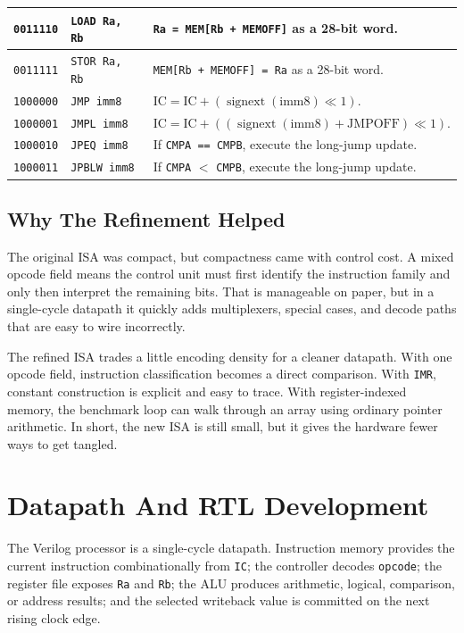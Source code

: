 \documentclass[12pt,a4paper]{article}
\begin{document}
\begin{table}[H]
\begin{tabularx}{\linewidth}{|l|l|Y|}
\texttt{0011110} & \texttt{LOAD Ra, Rb} & \texttt{Ra = MEM[Rb + MEMOFF]} as a 28-bit word. \\ \hline
\texttt{0011111} & \texttt{STOR Ra, Rb} & \texttt{MEM[Rb + MEMOFF] = Ra} as a 28-bit word. \\ \hline
\texttt{1000000} & \texttt{JMP imm8} & $\mathrm{IC} = \mathrm{IC} + (\operatorname{signext}(\mathrm{imm8}) \ll 1)$. \\ \hline
\texttt{1000001} & \texttt{JMPL imm8} & $\mathrm{IC} = \mathrm{IC} + ((\operatorname{signext}(\mathrm{imm8}) + \mathrm{JMPOFF}) \ll 1)$. \\ \hline
\texttt{1000010} & \texttt{JPEQ imm8} & If \texttt{CMPA == CMPB}, execute the long-jump update. \\ \hline
\texttt{1000011} & \texttt{JPBLW imm8} & If \texttt{CMPA} $<$ \texttt{CMPB}, execute the long-jump update. \\ \hline
\end{tabularx}
\label{tab:new_isa_full}
\end{table}

\subsection{Why The Refinement Helped}

The original ISA was compact, but compactness came with control cost. A mixed opcode field means the control unit must first identify the instruction family and only then interpret the remaining bits. That is manageable on paper, but in a single-cycle datapath it quickly adds multiplexers, special cases, and decode paths that are easy to wire incorrectly.

The refined ISA trades a little encoding density for a cleaner datapath. With one opcode field, instruction classification becomes a direct comparison. With \texttt{IMR}, constant construction is explicit and easy to trace. With register-indexed memory, the benchmark loop can walk through an array using ordinary pointer arithmetic. In short, the new ISA is still small, but it gives the hardware fewer ways to get tangled.

\section{Datapath And RTL Development}

The Verilog processor is a single-cycle datapath. Instruction memory provides the current instruction combinationally from \texttt{IC}; the controller decodes \texttt{opcode}; the register file exposes \texttt{Ra} and \texttt{Rb}; the ALU produces arithmetic, logical, comparison, or address results; and the selected writeback value is committed on the next rising clock edge.
\end{document}
